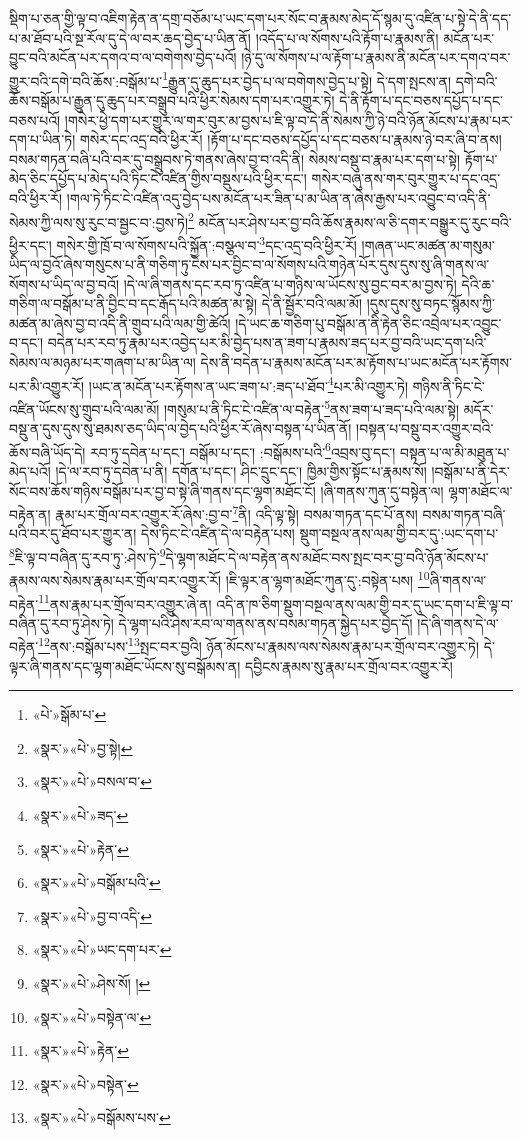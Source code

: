 སྡིག་པ་ཅན་གྱི་ལྟ་བ་འཇིག་རྟེན་ན་དགྲ་བཅོམ་པ་ཡང་དག་པར་སོང་བ་རྣམས་མེད་དོ་སྙམ་དུ་འཛིན་པ་སྟེ་དེ་ནི་དད་པ་མ་ཐོབ་པའི་སྔ་རོལ་དུ་དེ་ལ་བར་ཆད་བྱེད་པ་ཡིན་ནོ། །འདོད་པ་ལ་སོགས་པའི་རྟོག་པ་རྣམས་ནི། མངོན་པར་བྱུང་བའི་མངོན་པར་དགའ་བ་ལ་བགེགས་བྱེད་པའོ། །ཉེ་དུ་ལ་སོགས་པ་ལ་རྟོག་པ་རྣམས་ནི་མངོན་པར་དགའ་བར་གྱུར་བའི་དགེ་བའི་ཆོས་:བསྒོམ་པ་\footnote{«པེ་»སྒོམ་པ་}རྒྱུན་དུ་ཆུད་པར་བྱེད་པ་ལ་བགེགས་བྱེད་པ་སྟེ། དེ་དག་སྤངས་ན། དགེ་བའི་ཆོས་བསྒོམ་པ་རྒྱུན་དུ་ཆུད་པར་བསྒྲུབ་པའི་ཕྱིར་སེམས་དག་པར་འགྱུར་ཏེ། དེ་ནི་རྟོག་པ་དང་བཅས་དཔྱོད་པ་དང་བཅས་པའོ། །གསེར་ཕྱེ་དག་པར་གྱུར་ལ་གར་བུར་མ་བྱས་པ་ཇི་ལྟ་བ་དེ་ནི་སེམས་ཀྱི་ཉེ་བའི་ཉོན་མོངས་པ་རྣམ་པར་དག་པ་ཡིན་ཏེ། གསེར་དང་འདྲ་བའི་ཕྱིར་རོ། །རྟོག་པ་དང་བཅས་དཔྱོད་པ་དང་བཅས་པ་རྣམས་ཉེ་བར་ཞི་བ་ནས། བསམ་གཏན་བཞི་པའི་བར་དུ་བསྒྲུབས་ཏེ་གནས་ཞེས་བྱ་བ་འདི་ནི། སེམས་བསྡུ་བ་རྣམ་པར་དག་པ་སྟེ། རྟོག་པ་མེད་ཅིང་དཔྱོད་པ་མེད་པའི་ཏིང་ངེ་འཛིན་གྱིས་བསྡུས་པའི་ཕྱིར་དང་། གསེར་བཞུ་ནས་གར་བུར་གྱུར་པ་དང་འདྲ་བའི་ཕྱིར་རོ། །གལ་ཏེ་ཏིང་ངེ་འཛིན་འདུ་བྱེད་པས་མངོན་པར་ཟིན་པ་མ་ཡིན་ན་ཞེས་རྒྱས་པར་འབྱུང་བ་འདི་ནི་སེམས་ཀྱི་ལས་སུ་རུང་བ་སྦྱང་བ་:བྱས་ཏེ།\footnote{«སྣར་»«པེ་»བྱ་སྟེ།} མངོན་པར་ཤེས་པར་བྱ་བའི་ཆོས་རྣམས་ལ་ཅི་དགར་བསྒྱུར་དུ་རུང་བའི་ཕྱིར་དང་། གསེར་གྱི་ཁྲོ་བ་ལ་སོགས་པའི་སྐྱོན་:བསྩལ་བ་\footnote{«སྣར་»«པེ་»བསལ་བ་}དང་འདྲ་བའི་ཕྱིར་རོ། །གཞན་ཡང་མཚན་མ་གསུམ་ཡིད་ལ་བྱའོ་ཞེས་གསུངས་པ་ནི་གཅིག་ཏུ་ངེས་པར་བྱིང་བ་ལ་སོགས་པའི་གཉེན་པོར་དུས་དུས་སུ་ཞི་གནས་ལ་སོགས་པ་ཡིད་ལ་བྱ་བའོ། །དེ་ལ་ཞི་གནས་དང་རབ་ཏུ་འཛིན་པ་གཉིས་ལ་ཡོངས་སུ་བྱང་བར་མ་བྱས་ཏེ། དེའི་ཆ་གཅིག་ལ་བསྒོམ་པ་ནི་བྱིང་བ་དང་རྒོད་པའི་མཚན་མ་སྟེ། དེ་ནི་སྦྱོར་བའི་ལམ་མོ། །དུས་དུས་སུ་བཏང་སྙོམས་ཀྱི་མཚན་མ་ཞེས་བྱ་བ་འདི་ནི་གྲུབ་པའི་ལམ་གྱི་ཚེའོ། །དེ་ཡང་ཆ་གཅིག་པུ་བསྒོམ་ན་ནི་རྟེན་ཅིང་འབྲེལ་པར་འབྱུང་བ་དང་། བདེན་པར་རབ་ཏུ་རྣམ་པར་འབྱེད་པར་མི་བྱེད་པས་ན་ཟག་པ་རྣམས་ཟད་པར་བྱ་བའི་ཡང་དག་པའི་སེམས་ལ་མཉམ་པར་གཞག་པ་མ་ཡིན་ལ། དེས་ནི་བདེན་པ་རྣམས་མངོན་པར་མ་རྟོགས་པ་ཡང་མངོན་པར་རྟོགས་པར་མི་འགྱུར་རོ། །ཡང་ན་མངོན་པར་རྟོགས་ན་ཡང་ཟག་པ་:ཟད་པ་ཐོབ་\footnote{«སྣར་»«པེ་»ཟད་}པར་མི་འགྱུར་ཏེ། གཉིས་ནི་ཏིང་ངེ་འཛིན་ཡོངས་སུ་གྲུབ་པའི་ལམ་མོ། །གསུམ་པ་ནི་ཏིང་ངེ་འཛིན་ལ་བརྟེན་\footnote{«སྣར་»«པེ་»རྟེན་}ནས་ཟག་པ་ཟད་པའི་ལམ་སྟེ། མདོར་བསྡུ་ན་དུས་དུས་སུ་ཐམས་ཅད་ཡིད་ལ་བྱེད་པའི་ཕྱིར་རོ་ཞེས་བསྟན་པ་ཡིན་ནོ། །བསྟན་པ་བསྡུ་བར་འགྱུར་བའི་ཆོས་བཞི་ཡོད་དེ། རབ་ཏུ་དབེན་པ་དང་། བསྒོམ་པ་དང་། :བསྒོམས་པའི་\footnote{«སྣར་»«པེ་»བསྒོམ་པའི་}འབྲས་བུ་དང་། བསྟན་པ་ལ་མི་མཐུན་པ་མེད་པའོ། །དེ་ལ་རབ་ཏུ་དབེན་པ་ནི། དགོན་པ་དང་། ཤིང་དྲུང་དང་། ཁྱིམ་གྱིས་སྟོང་པ་རྣམས་སོ། །བསྒོམ་པ་ནི་དེར་སོང་བས་ཆོས་གཉིས་བསྒོམ་པར་བྱ་བ་སྟེ་ཞི་གནས་དང་ལྷག་མཐོང་ངོ། །ཞི་གནས་ཀུན་དུ་བསྟེན་ལ། ལྷག་མཐོང་ལ་བརྟེན་ན། རྣམ་པར་གྲོལ་བར་འགྱུར་རོ་ཞེས་:བྱ་བ་\footnote{«སྣར་»«པེ་»བྱ་བ་འདི་}ནི། འདི་ལྟ་སྟེ། བསམ་གཏན་དང་པོ་ནས། བསམ་གཏན་བཞི་པའི་བར་དུ་ཐོབ་པར་གྱུར་ན། དེས་ཏིང་ངེ་འཛིན་དེ་ལ་བརྟེན་པས། སྡུག་བསྔལ་ནས་ལམ་གྱི་བར་དུ་:ཡང་དག་པ་\footnote{«སྣར་»«པེ་»ཡང་དག་པར་}ཇི་ལྟ་བ་བཞིན་དུ་རབ་ཏུ་:ཤེས་ཏེ་\footnote{«སྣར་»«པེ་»ཤེས་སོ། །}དེ་ལྷག་མཐོང་དེ་ལ་བརྟེན་ནས་མཐོང་བས་སྤང་བར་བྱ་བའི་ཉོན་མོངས་པ་རྣམས་ལས་སེམས་རྣམ་པར་གྲོལ་བར་འགྱུར་རོ། །ཇི་ལྟར་ན་ལྷག་མཐོང་ཀུན་དུ་:བསྟེན་པས། \footnote{«སྣར་»«པེ་»བསྟེན་ལ་}ཞི་གནས་ལ་བརྟེན་\footnote{«སྣར་»«པེ་»རྟེན་}ནས་རྣམ་པར་གྲོལ་བར་འགྱུར་ཞེ་ན། འདི་ན་ཁ་ཅིག་སྡུག་བསྔལ་ནས་ལམ་གྱི་བར་དུ་ཡང་དག་པ་ཇི་ལྟ་བ་བཞིན་དུ་རབ་ཏུ་ཤེས་ཏེ། དེ་ལྷག་པའི་ཤེས་རབ་ལ་གནས་ནས་བསམ་གཏན་སྐྱེད་པར་བྱེད་དོ། །དེ་ཞི་གནས་དེ་ལ་བརྟེན་\footnote{«སྣར་»«པེ་»བསྟེན་}ནས་:བསྒོམ་པས་\footnote{«སྣར་»«པེ་»བསྒོམས་པས་}སྤང་བར་བྱའི། ཉོན་མོངས་པ་རྣམས་ལས་སེམས་རྣམ་པར་གྲོལ་བར་འགྱུར་ཏེ། དེ་ལྟར་ཞི་གནས་དང་ལྷག་མཐོང་ཡོངས་སུ་བསྒོམས་ན། དབྱིངས་རྣམས་སུ་རྣམ་པར་གྲོལ་བར་འགྱུར་རོ། 